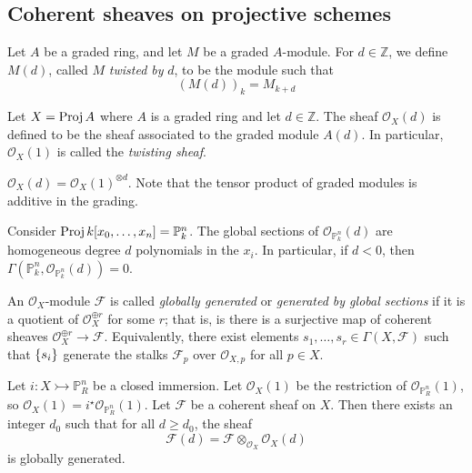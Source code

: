 \subsection{Coherent sheaves on projective schemes}
\begin{definition}
    Let \( A \) be a graded ring, and let \( M \) be a graded \( A \)-module.
    For \( d \in \mathbb Z \), we define \( M(d) \), called \( M \) \emph{twisted by} \( d \), to be the module such that
    \[ (M(d))_k = M_{k+d} \]
\end{definition}
\begin{definition}
    Let \( X = \operatorname{Proj} A \) where \( A \) is a graded ring and let \( d \in \mathbb Z \).
    The sheaf \( \mathcal O_X(d) \) is defined to be the sheaf associated to the graded module \( A(d) \).
    In particular, \( \mathcal O_X(1) \) is called the \emph{twisting sheaf}.
\end{definition}
\begin{remark}
    \( \mathcal O_X(d) = \mathcal O_X(1)^{\otimes d} \).
    Note that the tensor product of graded modules is additive in the grading.
\end{remark}
\begin{example}
    Consider \( \operatorname{Proj} k[x_0, \dots, x_n] = \mathbb P^n_k \).
    The global sections of \( \mathcal O_{\mathbb P^n_k}(d) \) are homogeneous degree \( d \) polynomials in the \( x_i \).
    In particular, if \( d < 0 \), then \( \Gamma(\mathbb P^n_k, \mathcal O_{\mathbb P^n_k}(d)) = 0 \).
\end{example}
\begin{definition}
    An \( \mathcal O_X \)-module \( \mathcal F \) is called \emph{globally generated} or \emph{generated by global sections} if it is a quotient of \( \mathcal O_X^{\oplus r} \) for some \( r \); that is, is there is a surjective map of coherent sheaves \( \mathcal O_X^{\oplus r} \to \mathcal F \).
    Equivalently, there exist elements \( s_1, \dots, s_r \in \Gamma(X, \mathcal F) \) such that \( \qty{s_i} \) generate the stalks \( \mathcal F_p \) over \( \mathcal O_{X,p} \) for all \( p \in X \).
\end{definition}
\begin{theorem}
    Let \( i : X \rightarrowtail \mathbb P^n_R \) be a closed immersion.
    Let \( \mathcal O_X(1) \) be the restriction of \( \mathcal O_{\mathbb P^n_R}(1) \), so \( \mathcal O_X(1) = i^\star \mathcal O_{\mathbb P^n_R}(1) \).
    Let \( \mathcal F \) be a coherent sheaf on \( X \).
    Then there exists an integer \( d_0 \) such that for all \( d \geq d_0 \), the sheaf
    \[ \mathcal F(d) = \mathcal F \otimes_{\mathcal O_X} \mathcal O_X(d) \]
    is globally generated.
\end{theorem}

